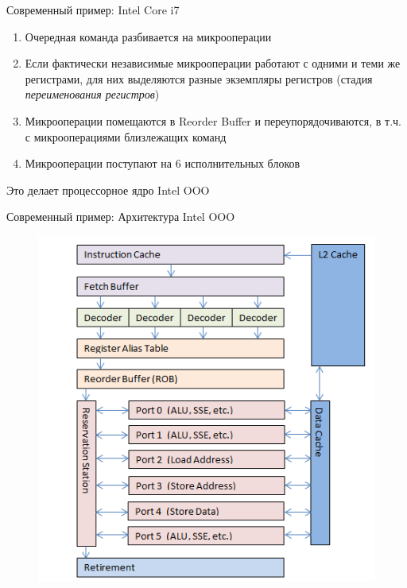 \documentclass[xetex,aspectratio=43]{beamer}
\begin{document}
\begin{frame}{Современный пример: Intel Core i7}
        \begin{enumerate}
            \tightlist
            \item
            Очередная команда разбивается на микрооперации
            \item
            Если фактически независимые микрооперации работают с одними и теми же
            регистрами, для них выделяются разные экземпляры регистров (стадия
            \emph{переименования регистров})
            \item
            Микрооперации помещаются в Reorder Buffer и переупорядочиваются, в
            т.ч. с микрооперациями близлежащих команд
            \item
            Микрооперации поступают на 6 исполнительных блоков
        \end{enumerate}

        Это делает процессорное ядро Intel OOO
\end{frame}

\begin{frame}{Современный пример: Архитектура Intel OOO}
    \begin{figure}
        \includegraphics[height=0.8\textheight]{img/11.Intel_OOO.png}
    \end{figure}
\end{frame}
\end{document}

